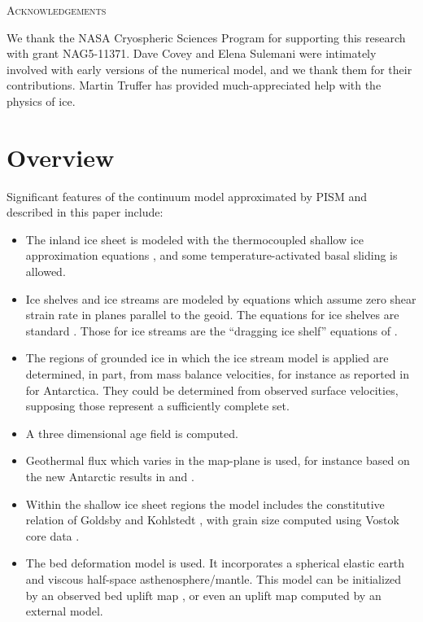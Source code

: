\documentclass[12pt,final]{amsart}%
\theoremstyle{plain}
\theoremstyle{definition}
\theoremstyle{remark}
\begin{document}
\centerline{\textsc{Acknowledgements}}
\bigskip

We thank the NASA Cryospheric Sciences Program for supporting this research with grant NAG5-11371.  Dave Covey and Elena Sulemani were intimately involved with early versions of the numerical model, and we thank them for their contributions.  Martin Truffer has provided much-appreciated help with the physics of ice.


\newpage
\section{Overview}
Significant features of the continuum model approximated by PISM and described in this paper include:\begin{itemize}
\item The inland ice sheet is modeled with the thermocoupled shallow ice approximation equations \citep{Fowler}, and some temperature-activated basal sliding is allowed.
\item Ice shelves and ice streams are modeled by equations which assume zero shear strain rate in planes parallel to the geoid.  The equations for ice shelves are standard \citep{Morland,MorlandZainuddin}.  Those for ice streams are the ``dragging ice shelf'' equations of \citep{MacAyeal,MacAyealetal}.
\item The regions of grounded ice in which the ice stream model is applied are determined, in part, from mass balance velocities, for instance as reported in \citep{BamberVaughanJoughin} for Antarctica.  They could be determined from observed surface velocities, supposing those represent a sufficiently complete set.
\item A three dimensional age field is computed.
\item Geothermal flux which varies in the map-plane is used, for instance based on the new Antarctic results in \citep{ShapiroRitzwoller} and \citep{FoxMaule}.
\item Within the shallow ice sheet regions the model includes the constitutive relation of Goldsby and Kohlstedt \citep{GoldsbyKohlstedt,Peltieretal}, with grain size computed using Vostok core data \citep{VostokCore}.
\item The \citet{LingleClark} bed deformation model is used.  It incorporates a spherical elastic earth and viscous half-space asthenosphere/mantle.  This model can be initialized by an observed bed uplift map \citep{BLKfastearth}, or even an uplift map computed by an external model.\end{itemize}
\end{document}
